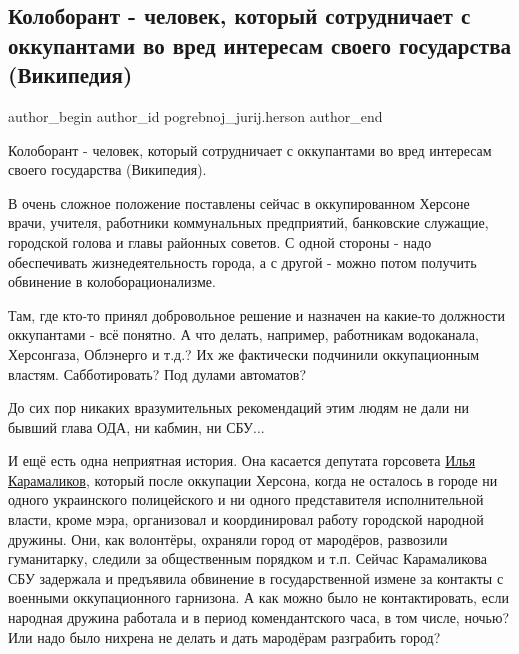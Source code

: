  
 
 
 
 
 
\subsection{Колоборант - человек, который сотрудничает с оккупантами во вред интересам своего государства (Википедия)}
\label{sec:30_04_2022.fb.pogrebnoj_jurij.herson.1.koloborant}
 
\ifcmt
 author_begin
   author_id pogrebnoj_jurij.herson
 author_end
\fi

Колоборант - человек, который сотрудничает с оккупантами во вред интересам
своего государства (Википедия).

В очень сложное положение поставлены сейчас в оккупированном Херсоне врачи,
учителя, работники коммунальных предприятий, банковские служащие, городской
голова и главы районных советов. С одной стороны - надо обеспечивать
жизнедеятельность города, а с другой - можно потом получить обвинение в
колоборационализме.

Там, где кто-то принял добровольное решение и назначен на какие-то должности
оккупантами - всё понятно. А что делать, например, работникам водоканала,
Херсонгаза, Облэнерго и т.д.? Их же фактически подчинили оккупационным властям.
Сабботировать? Под дулами автоматов?

До сих пор никаких вразумительных рекомендаций этим людям не дали ни бывший
глава ОДА, ни кабмин, ни СБУ...

И ещё есть одна неприятная история. Она касается депутата горсовета
\href{https://www.facebook.com/karamalikov.ilya}{Илья Карамаликов}, который
после оккупации Херсона, когда не осталось в городе ни одного украинского
полицейского и ни одного представителя исполнительной власти, кроме мэра,
организовал и координировал работу городской народной дружины. Они, как
волонтёры, охраняли город от мародёров, развозили гуманитарку, следили за
общественным порядком и т.п. Сейчас Карамаликова СБУ задержала и предъявила
обвинение в государственной измене за контакты с военными оккупационного
гарнизона. А как можно было не контактировать, если народная дружина работала и
в период комендантского часа, в том числе, ночью?  Или надо было нихрена не
делать и дать мародёрам разграбить город?

